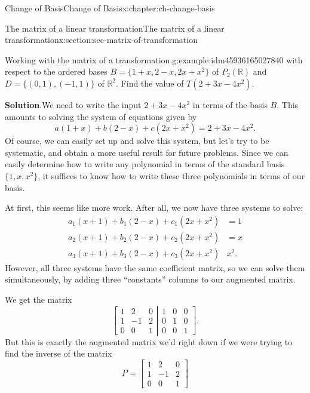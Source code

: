 \documentclass[oneside,10pt,]{book}
\newcommand{\blocktitlefont}{\relax}
\numberwithin{equation}{section}
\newcommand{\bbm}{\begin{bmatrix}}
\newcommand{\ebm}{\end{bmatrix}}
\newcommand{\R}{\mathbb{R}}
\newcommand{\amp}{&}
\begin{document}
\begin{chapterptx}{Change of Basis}{}{Change of Basis}{}{}{x:chapter:ch-change-basis}
\begin{sectionptx}{The matrix of a linear transformation}{}{The matrix of a linear transformation}{}{}{x:section:sec-matrix-of-transformation}
\begin{example}{Working with the matrix of a transformation.}{g:example:idm45936165027840}
with respect to the ordered bases \(B = \{1+x, 2-x, 2x+x^2\}\) of  \(P_2(\R)\) and \(D = \{(0,1),(-1,1)\}\) of \(\R^2\). Find the value of \(T(2+3x-4x^2)\).%
\par\smallskip%
\noindent\textbf{\blocktitlefont Solution}.\label{g:solution:idm45936165027104}{}\hypertarget{g:solution:idm45936165027104}{}\quad{}We need to write the input \(2+3x-4x^2\) in terms of the basis \(B\). This amounts to solving the system of equations given by%
\begin{equation*}
a(1+x)+b(2-x)+c(2x+x^2)=2+3x-4x^2\text{.}
\end{equation*}
Of course, we can easily set up and solve this system, but let's try to be systematic, and obtain a more useful result for future problems. Since we can easily determine how to write any polynomial in terms of the standard basis \(\{1,x,x^2\}\), it suffices to know how to write these three polynomials in terms of our basis.%
\par
At first, this seems like more work. After all, we now have three systems to solve:%
\begin{align*}
a_1(x+1)+b_1(2-x)+c_1(2x+x^2) \amp =1\\
a_2(x+1)+b_2(2-x)+c_2(2x+x^2) \amp =x\\
a_3(x+1)+b_3(2-x)+c_3(2x+x^2) \amp x^2\text{.}
\end{align*}
However, all three systems have the same coefficient matrix, so we can solve them simultaneously, by adding three ``constants'' columns to our augmented matrix.%
\par
We get the matrix%
\begin{equation*}
\left[\begin{matrix}1\amp 2\amp 0\\1\amp -1\amp 2\\0\amp 0\amp 1\end{matrix}
\right\rvert\left.\begin{matrix}1\amp 0\amp 0\\0\amp 1\amp 0\\0\amp 0\amp 1\end{matrix}\right]\text{.}
\end{equation*}
But this is exactly the augmented matrix we'd right down if we were trying to find the inverse of the matrix%
\begin{equation*}
P=\bbm 1\amp 2\amp 0\\1\amp -1\amp 2\\0\amp 0\amp 1\ebm
\end{equation*}

\end{example}
\end{sectionptx}
\end{chapterptx}
\end{document}

